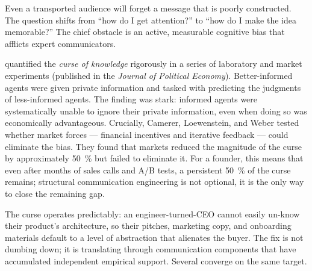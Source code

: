 Even a transported audience will forget a message that is poorly constructed. The question
shifts from ``how do I get attention?'' to ``how do I make the idea memorable?'' The chief
obstacle is an active, measurable cognitive bias that afflicts expert communicators.

\textcite{camerer1989curse} quantified the \emph{curse of knowledge} rigorously in a
series of laboratory and market experiments (published in the \emph{Journal of Political
Economy}). %
Better-informed agents were given private information and tasked with predicting the
judgments of less-informed agents. The finding was stark: informed agents were
systematically unable to ignore their private information, even when doing so was
economically advantageous. Crucially, Camerer, Loewenstein, and Weber tested whether
market forces — financial incentives and iterative feedback — could eliminate the bias.
They found that markets reduced the magnitude of the curse by approximately
\qty{50}{\percent} but failed to eliminate it. %
For a founder, this means that even after months of sales calls and A/B tests, a
persistent \qty{50}{\percent} of the curse remains; structural communication engineering
is not optional, it is the only way to close the remaining gap.

The curse operates predictably: an engineer-turned-CEO cannot easily un-know their
product's architecture, so their pitches, marketing copy, and onboarding materials default
to a level of abstraction that alienates the buyer. The fix is not dumbing down; it is
translating through communication components that have accumulated independent empirical
support. Several converge on the same target.

